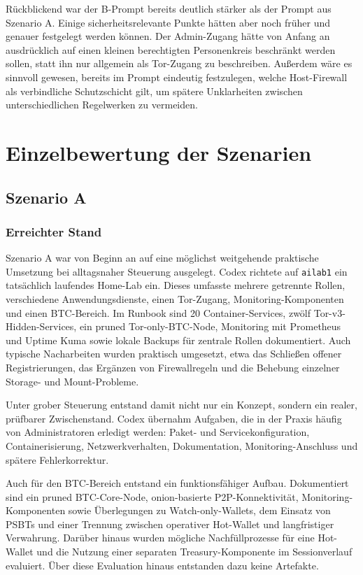 Rückblickend war der B-Prompt bereits deutlich stärker als der Prompt aus Szenario A. Einige sicherheitsrelevante Punkte hätten aber noch früher und genauer festgelegt werden können. Der Admin-Zugang hätte von Anfang an ausdrücklich auf einen kleinen berechtigten Personenkreis beschränkt werden sollen, statt ihn nur allgemein als Tor-Zugang zu beschreiben. Außerdem wäre es sinnvoll gewesen, bereits im Prompt eindeutig festzulegen, welche Host-Firewall als verbindliche Schutzschicht gilt, um spätere Unklarheiten zwischen unterschiedlichen Regelwerken zu vermeiden.


\section{Einzelbewertung der Szenarien}
\label{sec:einzelbewertung}

\subsection{Szenario A}

\subsubsection{Erreichter Stand}

Szenario A war von Beginn an auf eine möglichst weitgehende praktische Umsetzung bei alltagsnaher Steuerung ausgelegt. Codex richtete auf \texttt{ailab1} ein tatsächlich laufendes Home-Lab ein. Dieses umfasste mehrere getrennte Rollen, verschiedene Anwendungsdienste, einen Tor-Zugang, Monitoring-Komponenten und einen \ac{BTC}-Bereich. Im Runbook sind 20 Container-Services, zwölf Tor-v3-Hidden-Services, ein pruned Tor-only-\ac{BTC}-Node, Monitoring mit Prometheus und Uptime Kuma sowie lokale Backups für zentrale Rollen dokumentiert. Auch typische Nacharbeiten wurden praktisch umgesetzt, etwa das Schließen offener Registrierungen, das Ergänzen von Firewallregeln und die Behebung einzelner Storage- und Mount-Probleme.

Unter grober Steuerung entstand damit nicht nur ein Konzept, sondern ein realer, prüfbarer Zwischenstand. Codex übernahm Aufgaben, die in der Praxis häufig von Administratoren erledigt werden: Paket- und Servicekonfiguration, Containerisierung, Netzwerkverhalten, Dokumentation, Monitoring-Anschluss und spätere Fehlerkorrektur.

Auch für den \ac{BTC}-Bereich entstand ein funktionsfähiger Aufbau. Dokumentiert sind ein pruned \ac{BTC}-Core-Node, onion-basierte \ac{P2P}-Konnektivität, Monitoring-Komponenten sowie Überlegungen zu Watch-only-Wallets, dem Einsatz von \acp{PSBT} und einer Trennung zwischen operativer Hot-Wallet und langfristiger Verwahrung. 
Darüber hinaus wurden mögliche Nachfüllprozesse für eine Hot-Wallet und die Nutzung einer separaten Treasury-Komponente im Sessionverlauf evaluiert. Über diese Evaluation hinaus entstanden dazu keine Artefakte.

